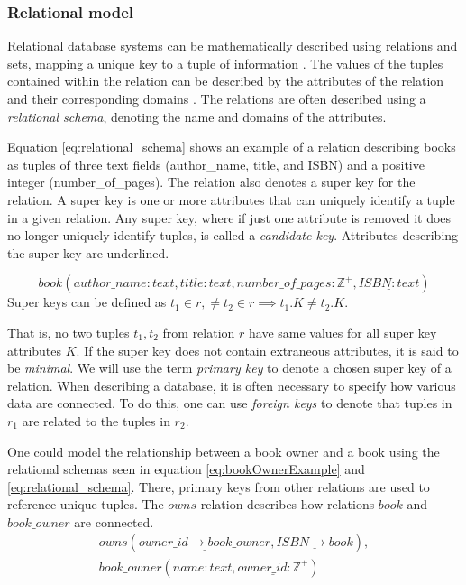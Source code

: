\subsubsection*{Relational model}
Relational database systems can be mathematically described using relations and sets, mapping a unique key to a tuple of information \cite[Chapter~2.3]{DBSBook}.
The values of the tuples contained within the relation can be described by the attributes of the relation and their corresponding domains \cite{KatjaFirstPP}. 
The relations are often described using a \textit{relational schema}, denoting the name and domains of the attributes.


Equation \ref{eq:relational_schema} shows an example of a relation describing books as tuples of three text fields (author\_name, title, and ISBN) and a positive integer (number\_of\_pages).
The relation also denotes a super key for the relation. A super key is one or more attributes that can uniquely identify a tuple in a given relation.
Any super key, where if just one attribute is removed it does no longer uniquely identify tuples, is called a \textit{candidate key}.
Attributes describing the super key are underlined.

\begin{equation} \label{eq:relational_schema}
    book(author\_name:text, title: text, number\_of\_pages:\mathbb{Z}^+, \underline{ISBN: text})
\end{equation}
Super keys can be defined as $t_1 \in r,\neq t_2 \in r \implies t_1.K \neq t_2.K$. 

That is, no two tuples $t_1, t_2$ from relation $r$ have same values for all super key attributes $K$. 
If the super key does not contain extraneous attributes, it is said to be \textit{minimal}. \cite[Chapter 2.3]{DBSBook}
We will use the term \textit{primary key} to denote a chosen super key of a relation. 
When describing a database, it is often necessary to specify how various data are connected. 
To do this, one can use \textit{foreign keys} to denote that tuples in $r_1$ are related to the tuples in $r_2$.


One could model the relationship between a book owner and a book using the relational schemas seen in equation \ref{eq:bookOwnerExample} and \ref{eq:relational_schema}.
There, primary keys from other relations are used to reference unique tuples. The $owns$ relation describes how relations $book$ and $book\_owner$ are connected. 
\begin{equation}\label{eq:bookOwnerExample}
    \begin{split}
        owns(\underline{owner\_id \rightarrow book\_owner}, \underline{ISBN \rightarrow book}), \\
        book\_owner(name:text,\underline{owner\_id:\mathbb{Z}^+})
    \end{split}
\end{equation}

